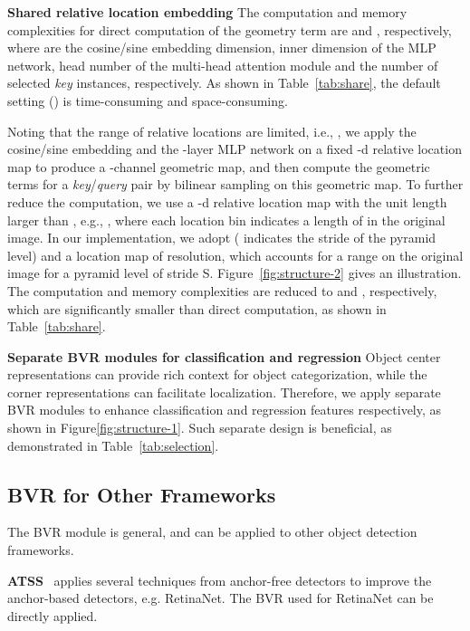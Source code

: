 \documentclass{article}
\def\eg{{e.g.}}
\def\ie{{i.e.}}
\begin{document}
{\noindent \textbf{Shared relative location embedding}}\hspace{3pt} The computation and memory complexities for direct computation of the geometry term are  and , respectively, where  are the cosine/sine embedding dimension, inner dimension of the MLP network, head number of the multi-head attention module and the number of selected \emph{key} instances, respectively. As shown in Table~\ref{tab:share}, the default setting () is time-consuming and space-consuming.

Noting that the range of relative locations are limited, \ie, , we apply the cosine/sine embedding and the -layer MLP network on a fixed -d relative location map to produce a -channel geometric map, and then compute the geometric terms for a \emph{key}/\emph{query} pair by bilinear sampling on this geometric map. To further reduce the computation, we use a -d relative location map with the unit length  larger than , \eg, , where each location bin indicates a length of  in the original image. In our implementation, we adopt  ( indicates the stride of the pyramid level) and a location map of  resolution, which accounts for a  range on the original image for a pyramid level of stride S. Figure~\ref{fig:structure-2} gives an illustration. The computation and memory complexities are reduced to  and , respectively, which are significantly smaller than direct computation, as shown in Table~\ref{tab:share}.

{\noindent \textbf{Separate BVR modules for classification and regression}}\hspace{3pt} Object center representations can provide rich context for object categorization, while the corner representations can facilitate localization. Therefore, we apply separate BVR modules to enhance classification and regression features respectively, as shown in Figure\ref{fig:structure-1}. Such separate design is beneficial, as demonstrated in Table~\ref{tab:selection}.

\subsection{BVR for Other Frameworks}
\label{BVRforOther}
The BVR module is general, and can be applied to other object detection frameworks.

{\noindent \textbf{ATSS}}~\cite{zhang2019bridging} applies several techniques from anchor-free detectors to improve the anchor-based detectors, e.g. RetinaNet. The BVR used for RetinaNet can be directly applied.
\end{document}
